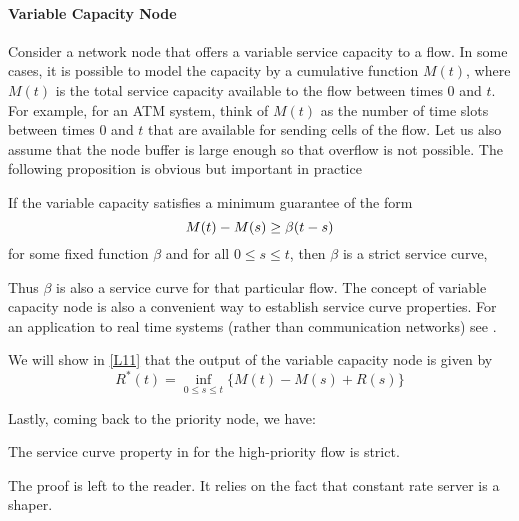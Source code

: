 \paragraph{Variable Capacity Node}
 Consider a network node that offers
a variable service capacity to a flow. In some cases, it is
possible to model the capacity by a cumulative function $M(t)$,
where $M(t)$ is the total service capacity available to the flow
between times $0$ and $t$. For example, for an ATM system, think
of $M(t)$ as the number of time slots between times $0$ and $t$
that are available for sending cells of the flow. Let us also
assume that the node buffer is large enough so that overflow is
not possible. The following proposition is obvious but important
in practice
\begin{proposition}
 If the variable capacity satisfies a minimum
guarantee of the form
\begin{equation}\mylabel{eq-mot-sc4}
 M(t) - M(s) \geq \beta(t-s)
\end{equation}
for some fixed function $\beta$ and for all $0\leq s \leq t$, then
$\beta$ is a strict service curve,
\end{proposition}
Thus $\beta$ is also a service curve for that particular flow. The
concept of variable capacity node is also a convenient way to
establish service curve properties. For an application to real
time systems (rather than communication networks) see
\cite{thiele98}.

We will show in \cref{L11} that the output of the variable
capacity node is given by
$$
R^*(t) = \inf_{0 \leq  s \leq t} \{M(t)-M(s) + R(s) \}
$$

Lastly, coming back to the priority node, we have:
\begin{proposition}
 The service curve property in  for the high-priority flow is strict.
\end{proposition}
The proof is left to the reader. It relies on the fact that
constant rate server is a shaper.




